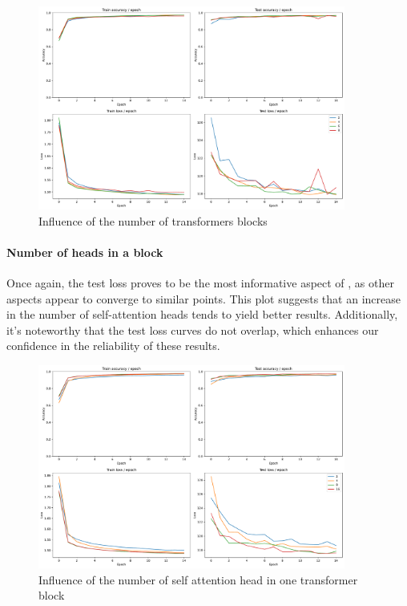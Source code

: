 \begin{figure}[H]
    \centering
    \includegraphics*[width=0.9\textwidth]{figs/Transformers/nb_block_influence.pdf}
    \caption{Influence of the number of transformers blocks}
    \label{fig:nb_block_influence}
\end{figure}

\paragraph{Number of heads in a block}
Once again, the test loss proves to be the most informative aspect of , as other aspects appear to converge to similar points. This plot suggests that an increase in the number of self-attention heads tends to yield better results. Additionally, it's noteworthy that the test loss curves do not overlap, which enhances our confidence in the reliability of these results.

\begin{figure}[H]
    \centering
    \includegraphics*[width=0.9\textwidth]{figs/Transformers/num_heads_influence.pdf}
    \caption{Influence of the number of self attention head in one transformer block }
    \label{fig:num_heads_influence}
\end{figure}

